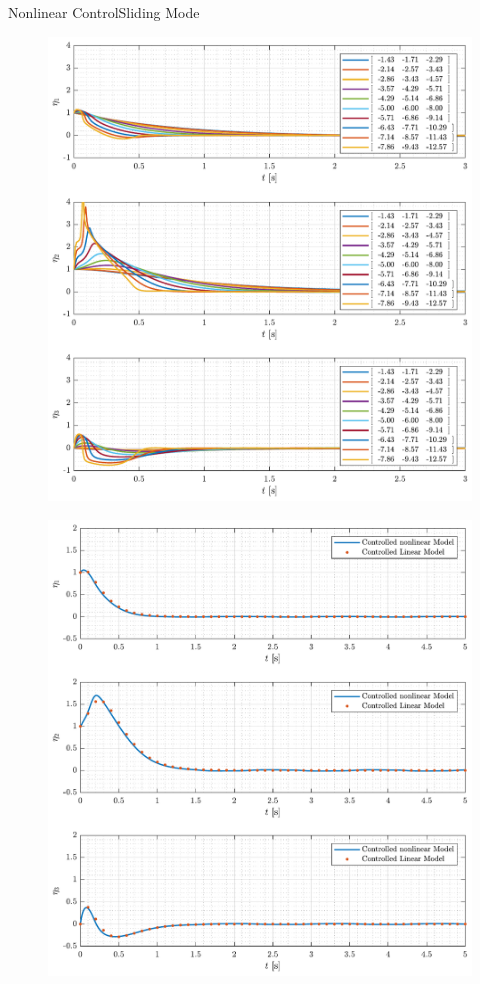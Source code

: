 \begin{frame}{Nonlinear Control}{Sliding Mode}
\begin{minipage}{\textwidth}
  \begin{minipage}{0.50\textwidth}
    \begin{figure}[H]
      \includegraphics[width=\textwidth]{figures/reducedOrderControlMany}
    \end{figure}
  \end{minipage}
  \begin{minipage}{0.50\textwidth}
    \begin{figure}[H]
      \includegraphics[width=\textwidth]{figures/reducedOrderControl}

\end{figure}
\end{minipage}
\end{minipage}
\end{frame}

